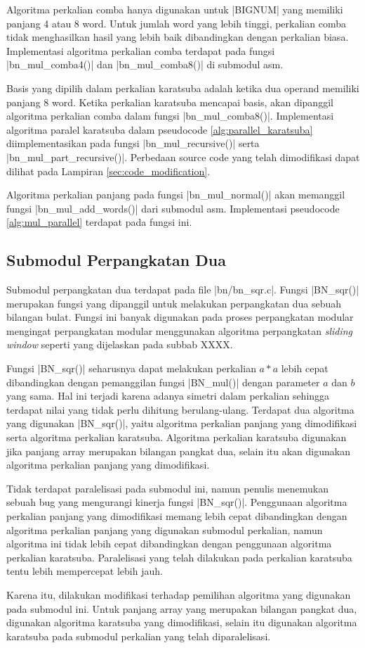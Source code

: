   Algoritma perkalian comba hanya digunakan untuk |BIGNUM| yang memiliki panjang 4 atau 8 word. Untuk jumlah word yang lebih tinggi, perkalian comba tidak menghasilkan hasil yang lebih baik dibandingkan dengan perkalian biasa. Implementasi algoritma perkalian comba terdapat pada fungsi |bn_mul_comba4()| dan |bn_mul_comba8()| di submodul asm.

  Basis yang dipilih dalam perkalian karatsuba adalah ketika dua operand memiliki panjang 8 word. Ketika perkalian karatsuba mencapai basis, akan dipanggil algoritma perkalian comba dalam fungsi |bn_mul_comba8()|. Implementasi algoritma paralel karatsuba dalam pseudocode \ref{alg:parallel_karatsuba} diimplementasikan pada fungsi |bn_mul_recursive()| serta |bn_mul_part_recursive()|. Perbedaan source code yang telah dimodifikasi dapat dilihat pada Lampiran \ref{sec:code_modification}.

  Algoritma perkalian panjang pada fungsi |bn_mul_normal()| akan memanggil fungsi |bn_mul_add_words()| dari submodul asm. Implementasi pseudocode \ref{alg:mul_parallel} terdapat pada fungsi ini.


\subsection{Submodul Perpangkatan Dua}
    Submodul perpangkatan dua terdapat pada file |bn/bn_sqr.c|. Fungsi |BN_sqr()| merupakan fungsi yang dipanggil untuk melakukan perpangkatan dua sebuah bilangan bulat. Fungsi ini banyak digunakan pada proses perpangkatan modular mengingat perpangkatan modular menggunakan algoritma perpangkatan \textit{sliding window} seperti yang dijelaskan pada subbab XXXX.

    Fungsi |BN_sqr()| seharusnya dapat melakukan perkalian $a*a$ lebih cepat dibandingkan dengan pemanggilan fungsi |BN_mul()| dengan parameter $a$ dan $b$ yang sama. Hal ini terjadi karena adanya simetri dalam perkalian sehingga terdapat nilai yang tidak perlu dihitung berulang-ulang. Terdapat dua algoritma yang digunakan |BN_sqr()|, yaitu algoritma perkalian panjang yang dimodifikasi serta algoritma perkalian karatsuba. Algoritma perkalian karatsuba digunakan jika panjang array merupakan bilangan pangkat dua, selain itu akan digunakan algoritma perkalian panjang yang dimodifikasi.

    Tidak terdapat paralelisasi pada submodul ini, namun penulis menemukan sebuah bug yang mengurangi kinerja fungsi |BN_sqr()|. Penggunaan algoritma perkalian panjang yang dimodifikasi memang lebih cepat dibandingkan dengan algoritma perkalian panjang yang digunakan submodul perkalian, namun algoritma ini tidak lebih cepat dibandingkan dengan penggunaan algoritma perkalian karatsuba. Paralelisasi yang telah dilakukan pada perkalian karatsuba tentu lebih mempercepat lebih jauh.

    Karena itu, dilakukan modifikasi terhadap pemilihan algoritma yang digunakan pada submodul ini. Untuk panjang array yang merupakan bilangan pangkat dua, digunakan algoritma karatsuba yang dimodifikasi, selain itu digunakan algoritma karatsuba pada submodul perkalian yang telah diparalelisasi.

